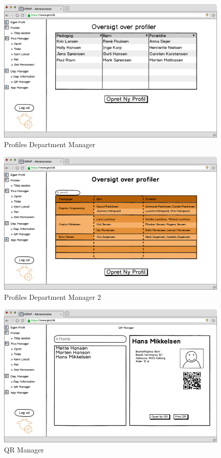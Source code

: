 \newpage

\begin{figure}[p]
\centering
\includegraphics[width=14cm]{images/mockup/profilerDeptManager.png}
\caption{Profiles Department Manager}
\label{fig:profiles_dept_manager}
\end{figure}

\begin{figure}[p]
\centering
\includegraphics[width=14cm]{images/mockup/profilerDeptManager1.png}
\caption{Profiles Department Manager 2}
\label{fig:profiles_dept_manager2}
\end{figure}

\newpage

\begin{figure}[p]
\centering
\includegraphics[width=14cm]{images/mockup/QR_manager.png}
\caption{QR Manager}
\label{fig:qr_manager}
\end{figure}


